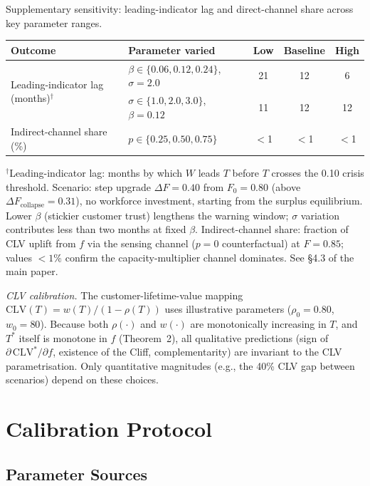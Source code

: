 \documentclass[msom,dblanonrev]{informs4}
\begin{document}
\begin{table}
\TABLE
{Supplementary sensitivity: leading-indicator lag and direct-channel share across key parameter ranges.\label{tab:ec:sensitivity2}}
{\begin{tabular}{@{}llccc@{}}
\toprule
\textbf{Outcome} & \textbf{Parameter varied} & \textbf{Low} & \textbf{Baseline} & \textbf{High} \\
\midrule
\multirow{2}{*}{Leading-indicator lag (months)$^{\dagger}$}
  & $\beta \in \{0.06, 0.12, 0.24\}$, $\sigma = 2.0$ & 21 & 12 & 6 \\
  & $\sigma \in \{1.0, 2.0, 3.0\}$, $\beta = 0.12$   & 11 & 12 & 12 \\[4pt]
\multirow{1}{*}{Indirect-channel share (\%)}
  & $p \in \{0.25, 0.50, 0.75\}$     & $<$1 & $<$1 & $<$1 \\
\bottomrule
\end{tabular}}
{$^{\dagger}$Leading-indicator lag: months by which $W$ leads $T$ before $T$ crosses the 0.10 crisis threshold. Scenario: step upgrade $\Delta F = 0.40$ from $F_0 = 0.80$ (above $\Delta F_{\mathrm{collapse}} = 0.31$), no workforce investment, starting from the surplus equilibrium. Lower $\beta$ (stickier customer trust) lengthens the warning window; $\sigma$ variation contributes less than two months at fixed $\beta$. Indirect-channel share: fraction of CLV uplift from $f$ via the sensing channel ($p{=}0$ counterfactual) at $F = 0.85$; values $<1\%$ confirm the capacity-multiplier channel dominates. See \S 4.3 of the main paper.}
\end{table}


\textit{CLV calibration.} The customer-lifetime-value mapping $\mathrm{CLV}(T) = w(T)/(1-\rho(T))$ uses illustrative parameters ($\rho_0 = 0.80$, $w_0 = 80$). Because both $\rho(\cdot)$ and $w(\cdot)$ are monotonically increasing in $T$, and $T^*$ itself is monotone in $f$ (Theorem~2), all qualitative predictions (sign of $\partial\,\mathrm{CLV}^*/\partial f$, existence of the Cliff, complementarity) are invariant to the CLV parametrisation. Only quantitative magnitudes (e.g., the 40\% CLV gap between scenarios) depend on these choices.

\section{Calibration Protocol}\label{sec:ec:calibration}

\subsection{Parameter Sources}
\end{document}
